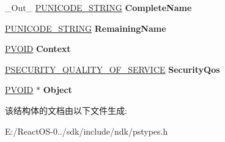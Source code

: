 \begin{DoxyCompactItemize}
\mbox{\label{struct___w_i_n32___p_a_r_s_e_m_e_t_h_o_d___p_a_r_a_m_e_t_e_r_s_a75ad9516c26ebca2f799690b468d3631}} 
\+\_\+\+Out\+\_\+ \hyperlink{struct___u_n_i_c_o_d_e___s_t_r_i_n_g}{P\+U\+N\+I\+C\+O\+D\+E\+\_\+\+S\+T\+R\+I\+NG} {\bfseries Complete\+Name}
\item 
\mbox{\label{struct___w_i_n32___p_a_r_s_e_m_e_t_h_o_d___p_a_r_a_m_e_t_e_r_s_a5a6afd93053efa188ed68219da35f065}} 
\hyperlink{struct___u_n_i_c_o_d_e___s_t_r_i_n_g}{P\+U\+N\+I\+C\+O\+D\+E\+\_\+\+S\+T\+R\+I\+NG} {\bfseries Remaining\+Name}
\item 
\mbox{\label{struct___w_i_n32___p_a_r_s_e_m_e_t_h_o_d___p_a_r_a_m_e_t_e_r_s_af3e9642ca1a4ee3ecc43ac928097f517}} 
\hyperlink{interfacevoid}{P\+V\+O\+ID} {\bfseries Context}
\item 
\mbox{\label{struct___w_i_n32___p_a_r_s_e_m_e_t_h_o_d___p_a_r_a_m_e_t_e_r_s_abd3dd518525f4b3f479c5bd0d683b707}} 
\hyperlink{struct___s_e_c_u_r_i_t_y___q_u_a_l_i_t_y___o_f___s_e_r_v_i_c_e}{P\+S\+E\+C\+U\+R\+I\+T\+Y\+\_\+\+Q\+U\+A\+L\+I\+T\+Y\+\_\+\+O\+F\+\_\+\+S\+E\+R\+V\+I\+CE} {\bfseries Security\+Qos}
\item 
\mbox{\label{struct___w_i_n32___p_a_r_s_e_m_e_t_h_o_d___p_a_r_a_m_e_t_e_r_s_aadf3eb44bdf0132ddf42d0528b3a9421}} 
\hyperlink{interfacevoid}{P\+V\+O\+ID} $\ast$ {\bfseries Object}
\end{DoxyCompactItemize}


该结构体的文档由以下文件生成\+:\begin{DoxyCompactItemize}
\item 
E\+:/\+React\+O\+S-\/0../sdk/include/ndk/pstypes.\+h\end{DoxyCompactItemize}
